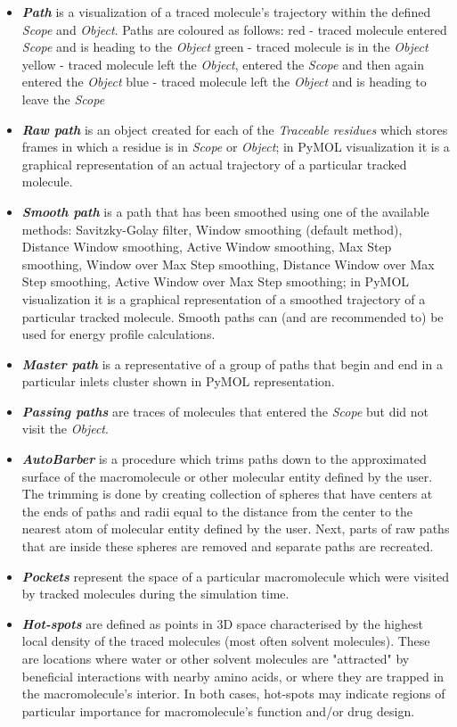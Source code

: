 \documentclass[9pt,tutorial, pubversion]{livecoms}
\begin{document}
\begin{itemize}
\item \textbf{\textit{Path}} is a visualization of a traced molecule's trajectory within the defined \textit{Scope} and \textit{Object}. Paths are coloured as follows:
red - traced molecule entered \textit{Scope} and is heading to the \textit{Object}
green - traced molecule is in the \textit{Object}
yellow - traced molecule left the \textit{Object}, entered the \textit{Scope} and then again entered the \textit{Object}
blue - traced molecule left the \textit{Object} and is heading to leave the \textit{Scope}
\item \textbf{\textit{Raw path}} is an object created for each of the \textit{Traceable residues} which stores frames in which a residue is in \textit{Scope} or \textit{Object}; in PyMOL visualization it is a graphical representation of an actual trajectory of a particular tracked molecule.
\item \textbf{\textit{Smooth path}} is a path that has been smoothed using one of the available methods: Savitzky-Golay filter, Window smoothing (default method), Distance Window smoothing, Active Window smoothing, Max Step smoothing, Window over Max Step smoothing, Distance Window over Max Step smoothing, Active Window over Max Step smoothing; in PyMOL visualization it is a graphical representation of a smoothed trajectory of a particular tracked molecule. Smooth paths can (and are recommended to) be used for energy profile calculations.
\item \textbf{\textit{Master path}} is a representative of a group of paths that begin and end in a particular inlets cluster shown in PyMOL representation. 
\item \textbf{\textit{Passing paths}} are traces of molecules that entered the \textit{Scope} but did not visit the \textit{Object}.
\item \textbf{\textit{AutoBarber}} is a procedure which trims paths down to the  approximated surface of the macromolecule or other molecular entity defined by the user. The trimming is done by creating collection of spheres that have centers at the ends of paths and radii equal to the distance from the center to the nearest atom of molecular entity defined by the user. Next, parts of raw paths that are inside these spheres are removed and separate paths are recreated.
\item \textbf{\textit{Pockets}} represent the space of a particular macromolecule which were visited by tracked molecules during the simulation time.
\item \textbf{\textit{Hot-spots}} are defined as points in 3D space characterised by the highest local density of the traced molecules (most often solvent molecules). These are locations where water or other solvent molecules are "attracted" by beneficial interactions with nearby amino acids, or where they are trapped in the macromolecule's interior. In both cases, hot-spots may indicate regions of particular importance for macromolecule's function and/or drug design.

\end{itemize}
\end{document}
